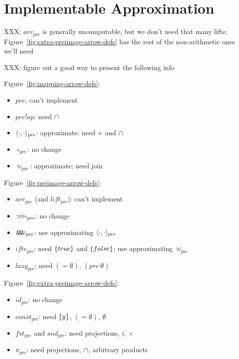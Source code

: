 \documentclass[preprint]{sigplanconf}
\newcommand{\arrowlift}{\ensuremath{lift}}
\newcommand{\arrowarr}{\ensuremath{arr}}
\newcommand{\arrowcomp}{\ensuremath{{>}\mspace{-6mu}{>}\mspace{-6mu}{>}}}
\newcommand{\arrowpair}{\ensuremath{\mathit{\&\mspace{-7.5mu}\&\mspace{-7.5mu}\&}}}
\newcommand{\arrowif}{\ensuremath{ifte}}
\newcommand{\arrowlazy}{\ensuremath{lazy}}
\newcommand{\pre}{_\mathrm{pre}}
\newcommand{\liftpre}{\arrowlift\pre}
\newcommand{\arrpre}{\arrowarr\pre}
\newcommand{\comppre}{\arrowcomp\pre}
\newcommand{\pairpre}{\arrowpair\pre}
\newcommand{\ifpre}{\arrowif\pre}
\newcommand{\lazypre}{\arrowlazy\pre}
\begin{document}
\section{Implementable Approximation}

XXX: $\arrpre$ is generally uncomputable, but we don't need that many lifts; Figure~\ref{fig:extra-preimage-arrow-defs} has the rest of the non-arithmetic ones we'll need

XXX: figure out a good way to present the following info

Figure~\ref{fig:mapping-arrow-defs}:
\begin{itemize}
	\item $pre$: can't implement
	\item $pre!ap$: need $\cap$
	\item $\pair{\cdot,\cdot}\pre$: approximate; need $\times$ and $\cap$
	\item $\circ\pre$: no change
	\item $\uplus\pre$: approximate; need join
\end{itemize}

Figure~\ref{fig:preimage-arrow-defs}:
\begin{itemize}
	\item $\arrpre$ (and $\liftpre$): can't implement
	\item $\comppre$: no change
	\item $\pairpre$: use approximating $\pair{\cdot,\cdot}\pre$
	\item $\ifpre$: need $\{{true}\}$ and $\{{false}\}$; use approximating $\uplus\pre$
	\item $\lazypre$: need $(= \emptyset)$, $(pre~\emptyset)$
\end{itemize}

Figure~\ref{fig:extra-preimage-arrow-defs}:
\begin{itemize}
	\item $id\pre$: no change
	\item $const\pre$: need $\{{y}\}$, $(= \emptyset)$, $\emptyset$
	\item $fst\pre$ and $snd\pre$: need projections, $i$, $\times$
	\item $\pi\pre$: need projections, $\cap$, arbitrary products
\end{itemize}
\end{document}
